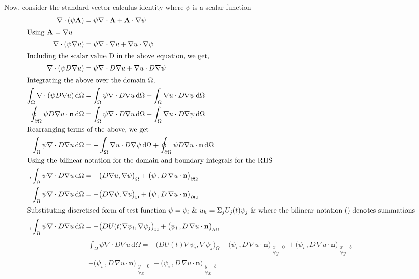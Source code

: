 \documentclass[a4paper]{article}
\begin{document}
    Now, consider the standard vector calculus identity where $\psi$ is a scalar function
    \begin{align}
        \nabla \cdot (\psi \mathbf{A}) &= \psi \nabla \cdot \mathbf{A} + \mathbf{A} \cdot \nabla \psi \\
        \intertext{Using $\mathbf{A} = \nabla u$}
        \nabla \cdot (\psi \nabla u) &= \psi \nabla \cdot \nabla u + \nabla u \cdot \nabla \psi \\
        \intertext{Including the scalar value D in the above equation, we get,}
        \nabla \cdot (\psi D \nabla u) &= \psi \nabla \cdot D \nabla u + \nabla u \cdot D \nabla \psi \\
        \intertext{Integrating the above over the domain $\Omega$,}
        \int_\Omega \nabla \cdot (\psi D \nabla u)\, \mathrm{d}\Omega &= \int_\Omega \psi \nabla \cdot D \nabla u\, \mathrm{d}\Omega + \int_\Omega\nabla u \cdot D \nabla \psi \, \mathrm{d}\Omega\\
        \oint_{\partial\Omega} \psi D  \nabla u\cdot \mathbf{n}\, \mathrm{d}\Omega &= \int_\Omega \psi \nabla \cdot D \nabla u\, \mathrm{d}\Omega + \int_\Omega\nabla u \cdot D \nabla \psi \, \mathrm{d}\Omega\\
        \intertext{Rearranging terms of the above, we get}
        \int_\Omega \psi \nabla \cdot D \nabla u\, \mathrm{d}\Omega & = - \int_\Omega\nabla u \cdot D \nabla \psi \, \mathrm{d}\Omega + \oint_{\partial\Omega} \psi D  \nabla u\cdot \mathbf{n}\, \mathrm{d}\Omega \\
    \intertext{Using the bilinear notation for the domain and boundary integrals for the RHS},
        \int_\Omega \psi \nabla \cdot D \nabla u\, \mathrm{d}\Omega & = - \big(D \nabla u,  \nabla \psi\big)_\Omega  +  \big(\psi \,, D \,  \nabla u\cdot \mathbf{n}\big)_{\partial\Omega} \\
        \int_\Omega \psi \nabla \cdot D \nabla u\, \mathrm{d}\Omega & = - \big(D   \nabla \psi, \nabla u \big)_\Omega  +  \big(\psi \,, D \,  \nabla u\cdot \mathbf{n}\big)_{\partial\Omega} \\
        \intertext{Substituting discretised form of test function $\psi = \psi_i$ \& $u_h = \Sigma_j U_j(t)\psi_j$ \& where the bilinear notation () denotes summations},
        \int_\Omega \psi \nabla \cdot D \nabla u\, \mathrm{d}\Omega & = - \big(D U(t) \nabla \psi_i, \nabla \psi_j \big)_\Omega  +  \big(\psi_i \,, D \, \nabla u\cdot \mathbf{n}\big)_{\partial\Omega} \label{eq:weak_form_diffusion_laplacian}
    \end{align}
    \begin{multline}
        \int_\Omega \psi \nabla \cdot D \nabla u\, \mathrm{d}\Omega = - \big(D U(t) \nabla \psi_i, \nabla \psi_j \big)_\Omega  +  \big(\psi_i \,, D \, \nabla u\cdot \mathbf{n}\big)_{\substack{x=0\\\forall y}} +  \big(\psi_i \,, D \, \nabla u\cdot \mathbf{n}\big)_{\substack{x=b\\\forall y}} \\ +  \big(\psi_i \,, D \, \nabla u\cdot \mathbf{n}\big)_{\substack{y=0\\\forall x}} +  \big(\psi_i \,, D \, \nabla u\cdot \mathbf{n}\big)_{\substack{y=b\\\forall x}}
    \end{multline}
\end{document}
